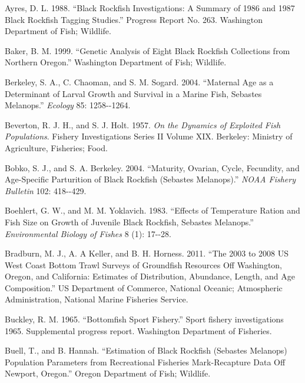 \documentclass[11pt,
  english,
  letterpaper,
]{article}
\newlength{\cslhangindent}
\newenvironment{CSLReferences}[2] %
 {%
  \setlength{\parindent}{0pt}
  \ifodd #1 \everypar{\setlength{\hangindent}{\cslhangindent}}\ignorespaces\fi
  \ifnum #2 > 0
  \setlength{\parskip}{#2\baselineskip}
  \fi
 }%
 {}
\begin{document}
\hypertarget{refs}{}
\begin{CSLReferences}{1}{0}
\leavevmode{}%
Ayres, D. L. 1988. {``Black Rockfish Investigations: A Summary of 1986 and 1987 Black Rockfish Tagging Studies.''} Progress Report No. 263. Washington Department of Fish; Wildlife.

\leavevmode{}%
Baker, B. M. 1999. {``Genetic Analysis of Eight Black Rockfish Collections from Northern Oregon.''} Washington Department of Fish; Wildlife.

\leavevmode{}%
Berkeley, S. A., C. Chaoman, and S. M. Sogard. 2004. {``Maternal Age as a Determinant of Larval Growth and Survival in a Marine Fish, Sebastes Melanops.''} \emph{Ecology} 85: 1258-\/-1264.

\leavevmode{}%
Beverton, R. J. H., and S. J. Holt. 1957. \emph{On the Dynamics of Exploited Fish Populations}. Fishery {Investigations} {Series II} {Volume XIX}. Berkeley: Ministry of Agriculture, Fisheries; Food.

\leavevmode{}%
Bobko, S. J., and S. A. Berkeley. 2004. {``Maturity, Ovarian, Cycle, Fecundity, and Age-Specific Parturition of Black Rockfish (Sebastes Melanops).''} \emph{NOAA Fishery Bulletin} 102: 418-\/-429.

\leavevmode{}%
Boehlert, G. W., and M. M. Yoklavich. 1983. {``Effects of Temperature Ration and Fish Size on Growth of Juvenile Black Rockfish, Sebastes Melanops.''} \emph{Environmental Biology of Fishes} 8 (1): 17-\/-28.

\leavevmode{}%
Bradburn, M. J., A. A Keller, and B. H. Horness. 2011. {``The 2003 to 2008 {US} {West} {Coast} Bottom Trawl Surveys of Groundfish Resources Off {Washington}, {Oregon}, and {California}: Estimates of Distribution, Abundance, Length, and Age Composition.''} US Department of Commerce, National Oceanic; Atmospheric Administration, National Marine Fisheries Service.

\leavevmode{}%
Buckley, R. M. 1965. {``Bottomfish Sport Fishery.''} Sport fishery investigations 1965. Supplemental progress report. Washington Department of Fisheries.

\leavevmode{}%
Buell, T., and B. Hannah. {``Estimation of Black Rockfish (Sebastes Melanops) Population Parameters from Recreational Fisheries Mark-Recapture Data Off Newport, Oregon.''} Oregon Department of Fish; Wildlife.


\end{CSLReferences}
\end{document}
